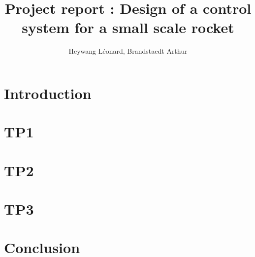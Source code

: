 \documentclass[twoside]{report}
\author{Heywang Léonard, Brandstaedt Arthur}
\title{Project report : Design of a control system for a small scale rocket}
\date{\DTMtoday}
\begin{document}



\tableofcontents
\listoffigures

\newpage
\chapter{Introduction}


\chapter{TP1}

\chapter{TP2}

\chapter{TP3}

\chapter{Conclusion}


\newpage
\appendix
\end{document}
